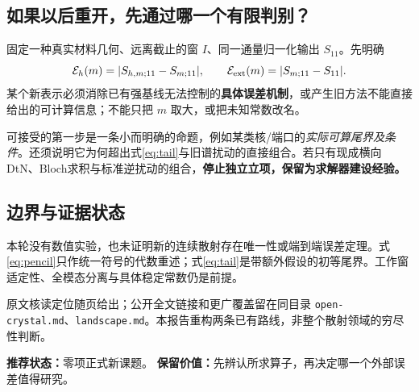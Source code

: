 \documentclass[UTF8,fontset=none,11pt,a4paper]{ctexart}
\begin{document}
\subsection*{如果以后重开，先通过哪一个有限判别？}
固定一种真实材料几何、远离截止的窗 $I$、同一通量归一化输出 $S_{11}$。先明确
\begin{equation}
 \mathcal E_h(m)=|S_{h,m;11}-S_{m;11}|,\qquad
 \mathcal E_{\mathrm{ext}}(m)=|S_{m;11}-S_{11}|.
\end{equation}
某个新表示必须消除已有强基线无法控制的\textbf{具体误差机制}，或产生旧方法不能直接给出的可计算信息；不能只把 $m$ 取大，或把未知常数改名。

可接受的第一步是一条小而明确的命题，例如某类核/端口的\emph{实际可算尾界及条件}。还须说明它为何超出式\eqref{eq:tail}与旧谱扰动的直接组合。若只有现成横向DtN、Bloch求积与标准逆扰动的组合，\textbf{停止独立立项，保留为求解器建设经验。}

\subsection*{边界与证据状态}
本轮没有数值实验，也未证明新的连续散射存在唯一性或端到端误差定理。式\eqref{eq:pencil}只作统一符号的代数重述；式\eqref{eq:tail}是带额外假设的初等尾界。工作窗适定性、全模态分离与具体稳定常数仍是前提。

原文核读定位随页给出；公开全文链接和更广覆盖留在同目录 \texttt{open-crystal.md}、\texttt{landscape.md}。本报告重构两条已有路线，非整个散射领域的穷尽性判断。

\vfill
{\small\color{navy}\textbf{推荐状态：}零项正式新课题。\quad
\textbf{保留价值：}先辨认所求算子，再决定哪一个外部误差值得研究。}
\end{document}
